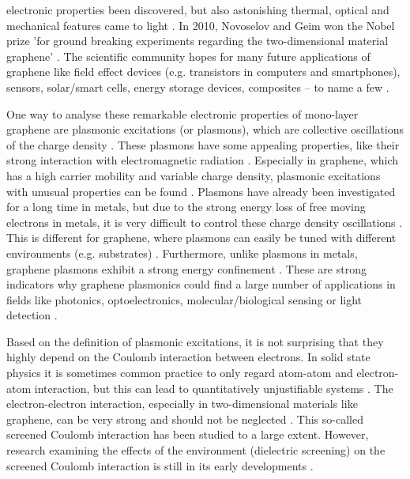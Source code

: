 electronic properties been discovered, but also astonishing thermal, optical and mechanical features came to light \cite{Singh2011}. In 2010, Novoselov and Geim won the Nobel prize 'for ground breaking experiments regarding the two-dimensional material graphene' \cite{Singh2011}. The scientific community hopes for many future applications of graphene like field effect devices (e.g. transistors in computers and smartphones), sensors, solar/smart cells, energy storage devices, composites -- to name a few \cite{Singh2011}.\medskip 



One way to analyse these remarkable electronic properties of mono-layer graphene are plasmonic excitations (or plasmons), which are collective oscillations of the charge density \cite{Bao2017}. These plasmons have some appealing properties, like their strong interaction with electromagnetic radiation \cite{Bao2017}. Especially in graphene, which has a high carrier mobility and variable charge density, plasmonic excitations with unusual properties can be found \cite{Bao2017}. Plasmons have already been investigated for a long time in metals, but due to the strong energy loss of free moving electrons in metals, it is very difficult to control these charge density oscillations \cite{Bao2017}. This is different for graphene, where plasmons can easily be tuned with different environments (e.g. substrates) \cite{Bao2017,Huang2016}. Furthermore, unlike plasmons in metals, graphene plasmons exhibit a strong energy confinement \cite{Huang2016}. These are strong indicators why graphene plasmonics could find a large number of applications in fields like photonics, optoelectronics, molecular/biological sensing or light detection \cite{Huang2016}.\medskip


Based on the definition of plasmonic excitations, it is not surprising that they highly depend on the Coulomb interaction between electrons. In solid state physics it is sometimes common practice to only regard atom-atom and electron-atom interaction, but this can lead to quantitatively unjustifiable systems \cite{Czycholl2016}. The electron-electron interaction, especially in two-dimensional materials like graphene, can be very strong and should not be neglected \cite{Noori2019}. This so-called screened Coulomb interaction has been studied to a large extent. However, research examining the effects of the environment (dielectric screening) on the screened Coulomb interaction is still in its early developments \cite{Noori2019}. \medskip

